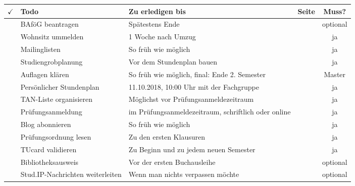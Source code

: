 
\begin{center}
\begin{tabularx}{\textwidth}{|p{3mm}|X|p{7.4cm}|c|c|}
\hline $\checkmark$ 
       & \textbf{Todo}             & \textbf{Zu erledigen bis}                                  & \textbf{Seite}               & \textbf{Muss?} \\ 
\hline & BAföG beantragen          & Spätestens Ende \iftoggle{winter}{Oktober}{April}          & \pageref{todobafoeg}         & optional \\ 
\hline & Wohnsitz ummelden         & 1 Woche nach Umzug                                         & \pageref{todoummelden}       & ja \\
\hline & Mailinglisten             & So früh wie möglich                                        & \pageref{mailinglisten}      & ja \\ 
\hline & Studiengrobplanung        & Vor dem Stundenplan bauen                                  & \pageref{grob}               & ja \\
\hline & Auflagen klären           & So früh wie möglich, final: Ende 2. Semester               & \pageref{auflagen}           & Master \\ 
\hline & Persönlicher Stundenplan  & 11.10.2018, 10:00 Uhr mit der Fachgruppe                   & \pageref{masterstundenplan}  & ja \\ 
\hline & TAN-Liste organisieren    & Möglichst vor Prüfungsanmeldezeitraum                      & \pageref{todoanmeldung}      & ja \\ 
\hline & Prüfungsanmeldung         & im Prüfungsanmeldezeitraum, schriftlich oder online        & \pageref{todoanmeldung}      & ja \\ 
\hline & Blog abonnieren           & So früh wie möglich                                        & \pageref{fachgruppe}         & ja \\ 
\hline & Prüfungsordnung lesen     & Zu den ersten Klausuren                                    & \pageref{po}                 & ja \\ 
\hline & TUcard validieren         & Zu Beginn und zu jedem neuen Semester                      & \pageref{tucard}             & ja \\
\hline & Bibliotheksausweis        & Vor der ersten Buchausleihe                                & \pageref{todobib}            & optional \\
\hline & Stud.IP-Nachrichten weiterleiten  & Wenn man nichts verpassen möchte         & \pageref{studipfwd}            & optional \\
\hline
\end{tabularx} 
\end{center}
